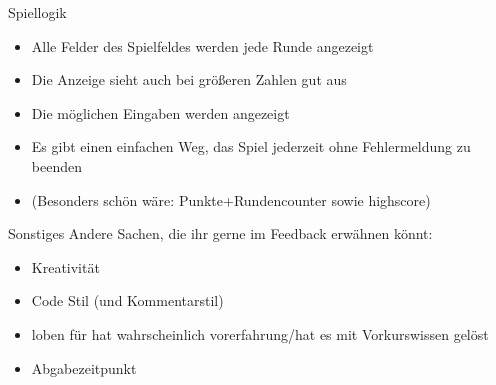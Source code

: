 \documentclass[ngerman,accentcolor=3c,colorbacktitle,12pt,T1,points=true, RGB]{tudaexercise}
\begin{document}
\begin{task}[points=auto]{Spiellogik}
\begin{subtask}[points=10,title={Anzeige}]
        \begin{itemize}
            \item Alle Felder des Spielfeldes werden jede Runde angezeigt
            \item Die Anzeige sieht auch bei größeren Zahlen gut aus
            \item Die möglichen Eingaben werden angezeigt
            \item Es gibt einen einfachen Weg, das Spiel jederzeit ohne Fehlermeldung zu beenden
            \item (Besonders schön wäre: Punkte+Rundencounter sowie highscore)
        \end{itemize}
    \end{subtask}
\end{task}
\begin{task}[points=auto]{Sonstiges}
    Andere Sachen, die ihr gerne im Feedback erwähnen könnt:
    \begin{itemize}
        \item Kreativität
        \item Code Stil (und Kommentarstil)
        \item loben für hat wahrscheinlich vorerfahrung/hat es mit Vorkurswissen gelöst
        \item Abgabezeitpunkt
    \end{itemize}
\end{task}
\end{document}
